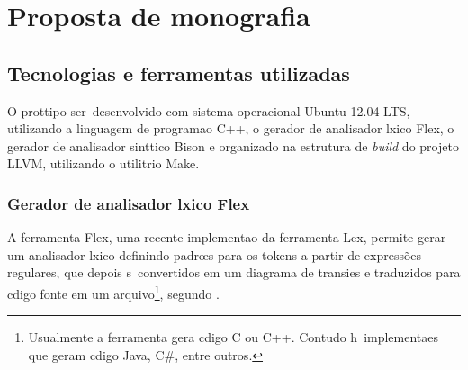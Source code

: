 
\chapter{Proposta de monografia}



\section{Tecnologias e ferramentas utilizadas}

O prot\oh tipo ser\ah\ desenvolvido com sistema operacional Ubuntu 12.04 LTS, utilizando a linguagem de programa\ca o C++, o gerador de analisador l\eh xico Flex, o gerador de analisador sint\ah tico Bison e organizado na estrutura de \emph{build} do projeto LLVM, utilizando o utilit\ah rio Make.



\subsection{Gerador de analisador l\eh xico Flex}

A ferramenta Flex, uma recente implementa\ca o da ferramenta Lex, permite gerar um analisador l\eh xico definindo padr\oe s para os tokens a partir de express\~oes regulares, que depois s\ao\ convertidos em um diagrama de transi\co es e traduzidos para c\oh digo fonte em um arquivo\footnote{Usualmente a ferramenta gera c\oh digo C ou C++. Contudo h\ah\ implementa\co es que geram c\oh digo Java, C\#, entre outros.}, segundo \cite{Aho08}.

